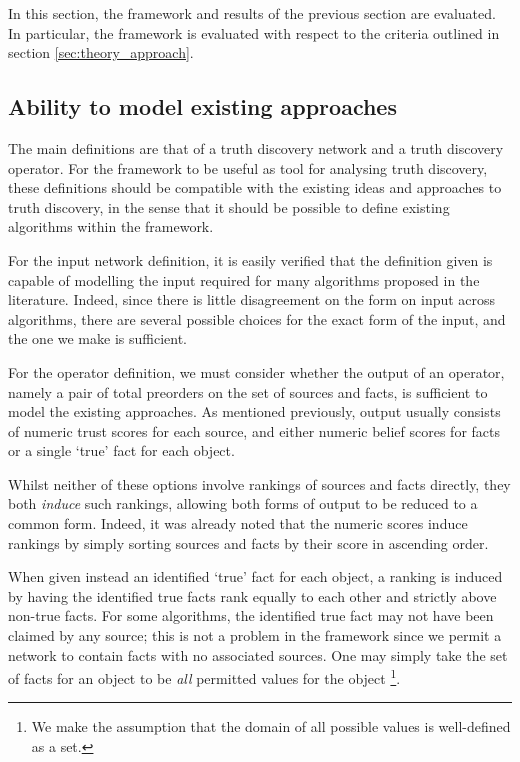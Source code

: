 \documentclass[../../main.tex]{subfiles}
\begin{document}
In this section, the framework and results of the previous section are
evaluated. In particular, the framework is evaluated with respect to the
criteria outlined in section \ref{sec:theory_approach}.

\subsection*{Ability to model existing approaches}

The main definitions are that of a truth discovery network and a truth
discovery operator. For the framework to be useful as tool for analysing truth
discovery, these definitions should be compatible with the existing ideas and
approaches to truth discovery, in the sense that it should be possible to
define existing algorithms within the framework.

For the input network definition, it is easily verified that the definition
given is capable of modelling the input required for many algorithms proposed
in the literature. Indeed, since there is little disagreement on the form on
input across algorithms, there are several possible choices for the exact form
of the input, and the one we make is sufficient.

For the operator definition, we must consider whether the output of an
operator, namely a pair of total preorders on the set of sources and facts, is
sufficient to model the existing approaches. As mentioned previously, output
usually consists of numeric trust scores for each source, and either numeric
belief scores for facts or a single `true' fact for each object.

Whilst neither of these options involve rankings of sources and facts directly,
they both \emph{induce} such rankings, allowing both forms of output to be
reduced to a common form. Indeed, it was already noted that the numeric
scores induce rankings by simply sorting sources and facts by their score in
ascending order.

When given instead an identified `true' fact for each object, a ranking is
induced by having the identified true facts rank equally to each other and
strictly above non-true facts. For some algorithms, the identified true fact
may not have been claimed by any source; this is not a problem in
the framework since we permit a network to contain facts with no associated
sources. One may simply take the set of facts for an object to be \emph{all}
permitted values for the object \footnote{We make the assumption that the
domain of all possible values is well-defined as a set.}.
\end{document}
